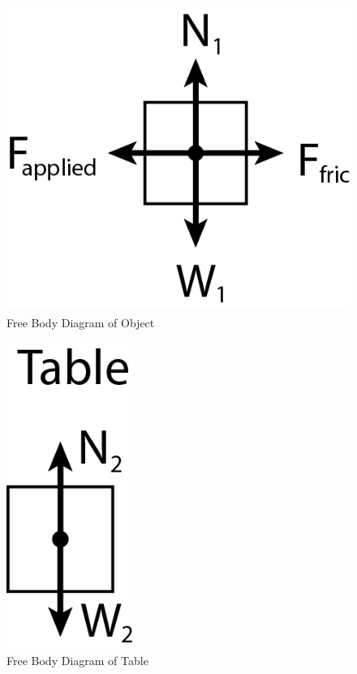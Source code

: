 \documentclass{chemlab}
\begin{document}
\begin{figure}[H]

{\centering \includegraphics[height=10cm]{./images/object-diagram} 

}

\caption{Free Body Diagram of Object}\label{fig:object}
\end{figure}

\begin{figure}[H]

{\centering \includegraphics[height=10cm]{./images/table-diagram} 

}

\caption{Free Body Diagram of Table}\label{fig:table}
\end{figure}
\end{document}
